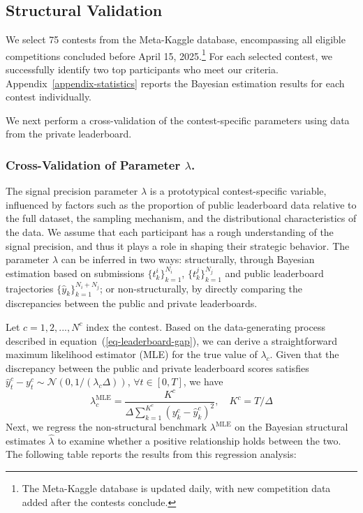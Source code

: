 \documentclass[mnsc]{informs3}
\begin{document}
\subsection{Structural Validation}


We select 75 contests from the Meta-Kaggle database, encompassing all eligible competitions concluded before April 15, 2025.\footnote{
The Meta-Kaggle database is updated daily, with new competition data added after the contests conclude.
}
For each selected contest, we successfully identify two top participants who meet our criteria.
Appendix~\ref{appendix-statistics} reports the Bayesian estimation results for each contest individually.

We next perform a cross-validation of the contest-specific parameters using data from the private leaderboard.

\subsubsection{Cross-Validation of Parameter $\lambda$.}

The signal precision parameter $\lambda$ is a prototypical contest-specific variable, influenced by factors such as the proportion of public leaderboard data relative to the full dataset, the sampling mechanism, and the distributional characteristics of the data.
We assume that each participant has a rough understanding of the signal precision, and thus it plays a role in shaping their strategic behavior.
The parameter $\lambda$ can be inferred in two ways: structurally, through Bayesian estimation based on submissions $\{t^i_k\}_{k=1}^{N_i}$, $\{t^j_k\}_{k=1}^{N_j}$ and public leaderboard trajectories $\{\hat{y}_{k}\}_{k=1}^{N_i+N_j}$; or non-structurally, by directly comparing the discrepancies between the public and private leaderboards.

Let $c = {1, 2, ..., N^c}$ index the contest.
Based on the data-generating process described in equation~(\ref{eq-leaderboard-gap}), we can derive a straightforward maximum likelihood estimator (MLE) for the true value of $\lambda_c$.
Given that the discrepancy between the public and private leaderboard scores satisfies $\hat{y}_t^c - y_t^c \sim \mathcal{N}(0, 1/(\lambda_c\Delta))$, $\forall t \in [0, T]$, we have 
\begin{equation*}
\lambda^{\text{MLE}}_c = \frac{K^c}{\Delta\sum^{K^c}_{k=1}(y_k^c - \hat{y}_k^c)^2}, \quad K^c = T/\Delta
\end{equation*}
Next, we regress the non-structural benchmark $\lambda^{\text{MLE}}$ on the Bayesian structural estimates $\hat\lambda$ to examine whether a positive relationship holds between the two.
The following table reports the results from this regression analysis: 
\end{document}
